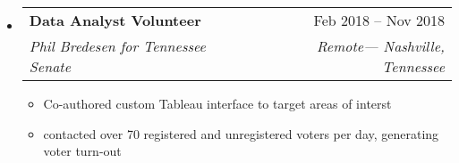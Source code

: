 \documentclass[12pt, letterpaper]{article}
\makeatletter
\newcommand{\resumeItem}[1]{
  \item\small{
    {#1 \vspace{-2pt}}
  }
}
\newcommand{\resumeSubheading}[4]{
  \vspace{-2pt}\item
    \begin{tabular*}{0.97\textwidth}[t]{l@{\extracolsep{\fill}}r}
      \textbf{#1} & #2 \\
      \textit{\small#3} & \textit{\small #4} \\
    \end{tabular*}\vspace{-7pt}
}
\newcommand{\resumeSubSubheading}[2]{
    \item
    \begin{tabular*}{0.97\textwidth}{l@{\extracolsep{\fill}}r}
      \textit{\small#1} & \textit{\small #2} \\
    \end{tabular*}\vspace{-7pt}
}
\newcommand{\resumeSubHeadingListStart}{\begin{itemize}[leftmargin=0.15in, label={}]}
\newcommand{\resumeSubHeadingListEnd}{\end{itemize}}
\newcommand{\resumeItemListStart}{\begin{itemize}} %
\newcommand{\resumeItemListEnd}{\end{itemize}\vspace{-16pt}}
\makeatother
\begin{document}
\resumeSubHeadingListStart
  \resumeSubheading
    {Data Analyst Volunteer}{Feb 2018 -- Nov 2018}
    {Phil Bredesen for Tennessee Senate}{Remote--- Nashville, Tennessee}
    \resumeItemListStart
      \resumeItem{Co-authored custom Tableau interface to target areas of interst}
      \resumeItem{contacted over 70 registered and unregistered voters per day, generating voter turn-out}
    \resumeItemListEnd
\resumeSubHeadingListEnd

\vspace{2pt}


\end{document}
